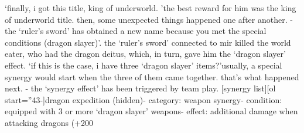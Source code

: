 ‘finally, i got this title, king of underworld.
’the best reward for him was the king of underworld title.
then, some unexpected things happened one after another.
- the ‘ruler’s sword’ has obtained a new name because you met the special conditions (dragon slayer)’.
the ‘ruler’s sword’ connected to mir killed the world eater, who had the dragon deitus, which, in turn, gave him the ‘dragon slayer’ effect.
‘if this is the case, i have three ‘dragon slayer’ items?’usually, a special synergy would start when the three of them came together.
that’s what happened next.
- the ‘synergy effect’ has been triggered by team play.
[synergy list][ol start=”43-]dragon expedition (hidden)- category: weapon synergy- condition: equipped with 3 or more ‘dragon slayer’ weapons- effect: additional damage when attacking dragons (+200%


 